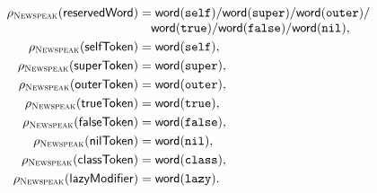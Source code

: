 \begin{equation}\label{eq:newspeak-word-tokens}
\begin{aligned}
 \rho_{\textsc{Newspeak}}(\mathsf{reservedWord})&=
   \mathsf{word}(\texttt{self})/\mathsf{word}(\texttt{super})/
   \mathsf{word}(\texttt{outer})/\\[-1mm]
 &\quad\mathsf{word}(\texttt{true})/\mathsf{word}(\texttt{false})/
   \mathsf{word}(\texttt{nil}),\\
 \rho_{\textsc{Newspeak}}(\mathsf{selfToken})&=\mathsf{word}(\texttt{self}),\\
 \rho_{\textsc{Newspeak}}(\mathsf{superToken})&=\mathsf{word}(\texttt{super}),\\
 \rho_{\textsc{Newspeak}}(\mathsf{outerToken})&=\mathsf{word}(\texttt{outer}),\\
 \rho_{\textsc{Newspeak}}(\mathsf{trueToken})&=\mathsf{word}(\texttt{true}),\\
 \rho_{\textsc{Newspeak}}(\mathsf{falseToken})&=\mathsf{word}(\texttt{false}),\\
 \rho_{\textsc{Newspeak}}(\mathsf{nilToken})&=\mathsf{word}(\texttt{nil}),\\
 \rho_{\textsc{Newspeak}}(\mathsf{classToken})&=\mathsf{word}(\texttt{class}),\\
 \rho_{\textsc{Newspeak}}(\mathsf{lazyModifier})&=\mathsf{word}(\texttt{lazy}).
\end{aligned}
\end{equation}

